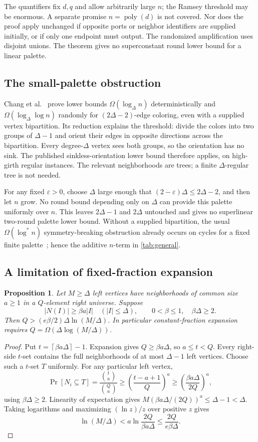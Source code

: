 \documentclass[11pt]{article}
\newtheorem{proposition}[theorem]{Proposition}
\theoremstyle{definition}
\theoremstyle{remark}
\newcommand{\eps}{\varepsilon}
\newcommand{\poly}{\operatorname{poly}}
\newcommand{\ceil}[1]{\left\lceil #1\right\rceil}
\newcommand{\abs}[1]{\left|#1\right|}
\newcommand{\logstar}{\log^*}
\begin{document}
The quantifiers fix $d,q$ and allow arbitrarily large $n$; the Ramsey
threshold may be enormous. A separate promise $n=\poly(d)$ is not
covered. Nor does the proof apply unchanged if opposite ports or
neighbor identifiers are supplied initially, or if only one endpoint
must output. The randomized amplification uses disjoint unions. The
theorem gives no superconstant round lower bound for a linear palette.

\subsection{The small-palette obstruction}
Chang et al.~\cite[Theorem 2]{CHLPU} prove lower bounds
$\Omega(\log_\Delta n)$ deterministically and
$\Omega(\log_\Delta\log n)$ randomly for $(2\Delta-2)$-edge coloring,
even with a supplied vertex bipartition. Its reduction explains the
threshold: divide the colors into two groups of $\Delta-1$ and orient
their edges in opposite directions across the bipartition. Every
degree-$\Delta$ vertex sees both groups, so the orientation has no sink.
The published sinkless-orientation lower bound therefore applies, on
high-girth regular instances. The relevant neighborhoods are trees;
a finite $\Delta$-regular tree is not needed.

For any fixed $\eps>0$, choose $\Delta$ large enough that
$(2-\eps)\Delta\le2\Delta-2$, and then let $n$ grow. No round bound
depending only on $\Delta$ can provide this palette uniformly over
$n$. This leaves $2\Delta-1$ and $2\Delta$ untouched and gives no
superlinear two-round palette lower bound. Without a supplied
bipartition, the usual $\Omega(\logstar n)$ symmetry-breaking
obstruction already occurs on cycles for a fixed finite
palette~\cite{Linial}; hence the additive $n$-term in
\cref{tab:general}.

\subsection{A limitation of fixed-fraction expansion}
\begin{proposition}\label{prop:expanderbarrier}
Let $M\ge\Delta$ left vertices have neighborhoods of common size
$a\ge1$ in a $Q$-element right universe. Suppose
\[
 \abs{N(I)}\ge\beta a\abs I\quad(\abs I\le\Delta),
 \qquad 0<\beta\le1,\quad\beta\Delta\ge2.
\]
Then $Q>(e\beta/2)\Delta\ln(M/\Delta)$. In particular constant-fraction
expansion requires $Q=\Omega(\Delta\log(M/\Delta))$.
\end{proposition}
\begin{proof}
Put $t=\ceil{\beta a\Delta}-1$. Expansion gives $Q\ge\beta a\Delta$,
so $a\le t<Q$. Every right-side $t$-set contains the full neighborhoods
of at most $\Delta-1$ left vertices. Choose such a $t$-set $T$ uniformly.
For any particular left vertex,
\[
 \Pr[N_i\subseteq T]
 =\frac{\binom ta}{\binom Qa}
 \ge\left(\frac{t-a+1}{Q}\right)^a
 \ge\left(\frac{\beta a\Delta}{2Q}\right)^a,
\]
using $\beta\Delta\ge2$. Linearity of expectation gives
$M(\beta a\Delta/(2Q))^a\le\Delta-1<\Delta$.
Taking logarithms and maximizing $(\ln z)/z$ over positive $z$ gives
\[
 \ln(M/\Delta)<a\ln\frac{2Q}{\beta a\Delta}
 \le\frac{2Q}{e\beta\Delta}.
\]
\end{proof}
\end{document}
